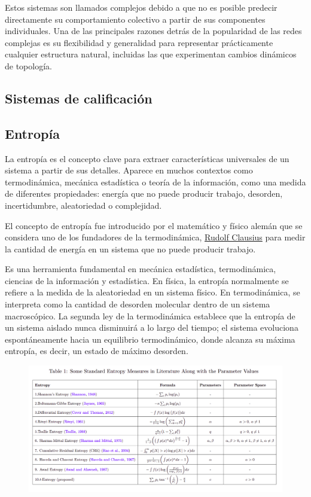 Estos sistemas son llamados complejos debido a que no es posible predecir directamente su 
comportamiento colectivo a partir de sus componentes individuales. Una de las principales razones detrás de 
la popularidad de las redes complejas es su flexibilidad
y generalidad para representar prácticamente cualquier estructura natural, incluidas las que experimentan 
cambios dinámicos de topología.\cite{CN-review}
\subsection{Sistemas de calificación}

\subsection{Entropía}
\begin{definicion}[Entropía]\label{def:entropy}
La entropía es el concepto clave para extraer características universales de un sistema a partir de sus 
detalles. Aparece en muchos contextos como termodinámica, mecánica estadística o teoría de la información, como 
una medida de diferentes propiedades: energía que no puede producir trabajo, desorden, incertidumbre, 
aleatoriedad o complejidad.\cite{gen-entr-review}

El concepto de entropía fue introducido por el matemático y físico alemán que se considera uno de los fundadores 
de la termodinámica,
\href{https://www.engineeringenotes.com/thermal-engineering/entropy/entropy-clausius-theorem-property-equations-and-representation-thermodynamics/49188}{Rudolf Clausius} 
para medir la cantidad de energía en un sistema que no puede producir trabajo.

Es una herramienta fundamental en mecánica estadística, termodinámica, ciencias de la información
y estadística. En física, la entropía normalmente se refiere a la medida de la aleatoriedad en un sistema físico. 
En termodinámica, se interpreta como la cantidad de desorden molecular dentro de un sistema macroscópico. 
La segunda ley de la termodinámica establece que la entropía de un sistema aislado nunca disminuirá
a lo largo del tiempo; el sistema evoluciona espontáneamente hacia un equilibrio termodinámico, donde alcanza su
máxima entropía, es decir, un estado de máximo desorden.\cite{t-entropy}

\begin{figure}[h!]
    \centering
    \includegraphics[scale=0.5]{./img/entropies.png}
    \label{img:entropies}
\end{figure}
\end{definicion}

